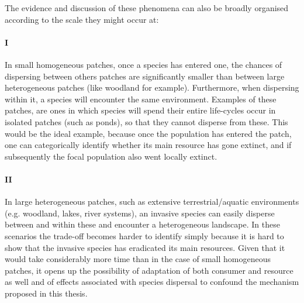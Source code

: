 \documentclass[a4paper]{report}
\begin{document}
The evidence and discussion of these phenomena can also be broadly organised according to the scale they might occur at:

\paragraph{I} In small homogeneous patches, once a species has entered one, the chances of dispersing between others patches are significantly smaller than between large heterogeneous patches (like woodland for example). Furthermore, when dispersing within it, a species will encounter the same environment. Examples of these patches, are ones in which species will spend their entire life-cycles occur in isolated patches (such as ponds), so that they cannot disperse from these. This would be the ideal example, because once the population has entered the patch, one can categorically identify whether its main resource has gone extinct, and if subsequently the focal population also went locally extinct. 

\paragraph{II}  In large heterogeneous patches, such as extensive terrestrial/aquatic environments (e.g. woodland, lakes, river systems), an invasive species can easily disperse between and within these and encounter a heterogeneous landscape. In these scenarios the trade-off becomes harder to identify simply because it is hard to show that the invasive species has eradicated its main resources. Given that it would take considerably more time than in the case of small homogeneous patches, it opens up the possibility of adaptation of both consumer and resource as well and of effects associated with species dispersal to confound the mechanism proposed in this thesis.\\
\end{document}
